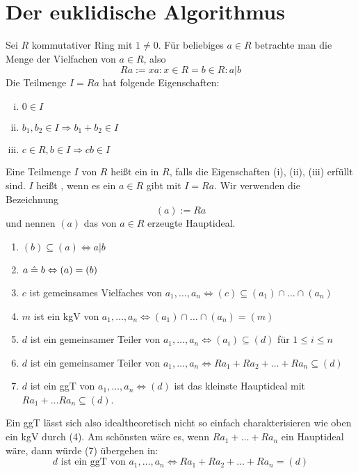 \section{Der euklidische Algorithmus}
\label{sec:para2}
	Sei $R$ kommutativer Ring mit $1 \neq 0$. Für beliebiges $a \in R$ betrachte man die Menge der Vielfachen von $a \in R$, also
	\[ Ra := {xa : x \in R} = {b \in R : a|b} \]
	Die Teilmenge $I = Ra$ hat folgende Eigenschaften:
	\begin{enumerate}[(i)]
		\item $0 \in I$
		\item $b_1,b_2 \in I \Rightarrow b_1+b_2 \in I$
		\item $c \in R, b \in I \Rightarrow cb \in I$
	\end{enumerate}
	
\begin{defn} \label{def_2.1}
	Eine Teilmenge $I$ von $R$ heißt ein  in $R$, falls die Eigenschaften (i), (ii), (iii) erfüllt sind. $I$ heißt , wenn es ein $a \in R$ gibt mit $I = Ra$. Wir verwenden die Bezeichnung
	\[ (a) := Ra \]
	und nennen $(a)$ das von $a \in R$ erzeugte Hauptideal.
\end{defn}

	\begin{enumerate}[(1)]
		\item $(b) \subseteq (a) \Leftrightarrow a | b$
		\item $a \mathrel{\hat=} b \Leftrightarrow (a) = (b)$
		\item $c$ ist gemeinsames Vielfaches von $a_1,\dots,a_n \Leftrightarrow (c) \subseteq (a_1) \cap \dots \cap (a_n)$
		\item $m$ ist ein kgV von $a_1,\dots,a_n \Leftrightarrow (a_1) \cap \dots \cap (a_n) = (m)$
		\item $d$ ist ein gemeinsamer Teiler von $a_1,\dots,a_n \Leftrightarrow (a_i) \subseteq (d)$ für $1 \leq i \leq n$
		\item $d$ ist ein gemeinsamer Teiler von $a_1,\dots,a_n \Leftrightarrow Ra_1 + Ra_2 + \dots + Ra_n \subseteq (d)$
		\item $d$ ist ein ggT von $a_1,\dots,a_n \Leftrightarrow (d)$ ist das kleinste Hauptideal mit $Ra_1 + \dots Ra_n \subseteq (d)$.
	\end{enumerate}
	Ein ggT lässt sich also idealtheoretisch nicht so einfach charakterisieren wie oben ein kgV durch (4). Am schönsten wäre es, wenn $Ra_1 + \dots + Ra_n$ ein Hauptideal wäre, dann würde (7) übergehen in:
	\[ d \text{ ist ein ggT von } a_1,\dots,a_n \Leftrightarrow Ra_1+Ra_2+ \dots + Ra_n = (d) \]
	
